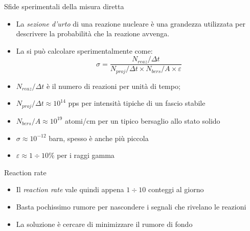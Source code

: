 \documentclass [xcolor=svgnames] {beamer}
\begin{document}
\begin{frame}{Sfide sperimentali della misura diretta}
	\begin{itemize}
		\item La \emph{sezione d'urto} di una reazione nucleare è una grandezza utilizzata per descrivere la probabilità che la reazione avvenga.
		\item La si può calcolare sperimentalmente come:
		\begin{equation}
			\sigma = \dfrac{N_{reaz}/\Delta t}{N_{proj}/\Delta t \times N_{bers}/A \times \varepsilon}
		\end{equation}
	\item<2-> $N_{reaz}/\Delta t$ è il numero di reazioni per unità di tempo;
	\item<3-> $N_{proj}/\Delta t \approx 10^{14}$ pps per intensità tipiche di un fascio stabile
	\item<4-> $N_{bers}/A \approx 10^{19}$ atomi/cm per un tipico bersaglio allo stato solido
	\item<5-> $\sigma \approx 10^{-12}$ barn, spesso è anche più piccola
	\item<6-> $\varepsilon \approx 1 \div 10 \%$ per i raggi gamma
	\end{itemize}
\end{frame}
\begin{frame}{Reaction rate}
	\begin{itemize}
		\item<1-> Il \emph{reaction rate} vale quindi appena $1\div 10$ conteggi al giorno
		\item<2-> Basta pochissimo rumore per nascondere i segnali che rivelano le reazioni
		\item<3-> La soluzione è cercare di minimizzare il rumore di fondo 
	\end{itemize}
\end{frame}
\end{document}
